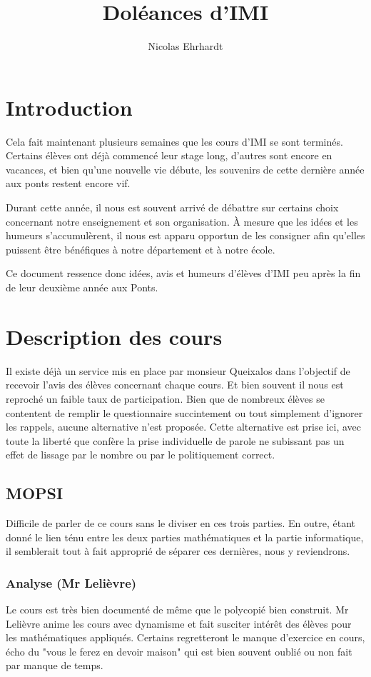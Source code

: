 \documentclass{report}
\author{Nicolas Ehrhardt}
\title{Doléances d'IMI}
\begin{document}
\maketitle
\chapter{Introduction}

Cela fait maintenant plusieurs semaines que les cours d'IMI se sont terminés. Certains élèves ont déjà commencé leur stage long, d'autres sont encore en vacances, et bien qu'une nouvelle vie débute, les souvenirs de cette dernière année aux ponts restent encore vif.

Durant cette année, il nous est souvent arrivé de débattre sur certains choix concernant notre enseignement et son organisation. À mesure que les idées et les humeurs s'accumulèrent, il nous est apparu opportun de les consigner afin qu'elles puissent être bénéfiques à notre département et à notre école.

Ce document ressence donc idées, avis et humeurs d'élèves d'IMI peu après la fin de leur deuxième année aux Ponts.

\chapter{Description des cours} 

Il existe déjà un service mis en place par monsieur Queixalos dans l'objectif de recevoir l'avis des élèves concernant chaque cours. Et bien souvent il nous est reproché un faible taux de participation. Bien que de nombreux élèves se contentent de remplir le questionnaire succintement ou tout simplement d'ignorer les rappels, aucune alternative n'est proposée. Cette alternative est prise ici, avec toute la liberté que confère la prise individuelle de parole ne subissant pas un effet de lissage par le nombre ou par le politiquement correct.

\section{MOPSI}

Difficile de parler de ce cours sans le diviser en ces trois parties. En outre, étant donné le lien ténu entre les deux parties mathématiques et la partie informatique, il semblerait tout à fait approprié de séparer ces dernières, nous y reviendrons.

\subsection{Analyse (Mr Lelièvre)}
Le cours est très bien documenté de même que le polycopié bien construit. Mr Lelièvre anime les cours avec dynamisme et fait susciter intérêt des élèves pour les mathématiques appliqués. Certains regretteront le manque d'exercice en cours, écho du "vous le ferez en devoir maison" qui est bien souvent oublié ou non fait par manque de temps.
\end{document}
